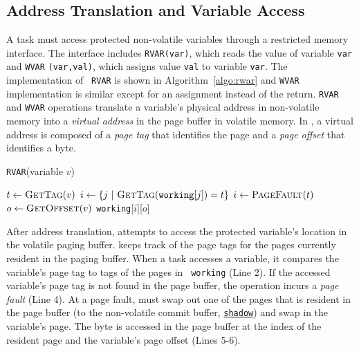 \subsection{Address Translation and Variable Access}

A \sys task must access protected non-volatile variables through a restricted memory
interface. The interface includes \texttt{RVAR(var)}, which reads the value of
variable {\tt var} and \texttt{WVAR} \texttt{(var,val)}, which assigns
value {\tt val} to variable {\tt var}. The implementation of {\tt
RVAR} is shown in Algorithm~\ref{algo:rwar} and {\tt WVAR} implementation is
similar except for an assignment instead of the return.
%
{\tt RVAR} and {\tt WVAR} operations translate a variable's physical address in non-volatile memory into a \emph{virtual address} in the page buffer in volatile memory.  In \sys, a virtual address is composed of a \emph{page tag} that identifies the page and a \emph{page offset} that identifies a byte.


\begin{algorithm}[t]
	\caption{\texttt{RVAR}(variable $v$)}
	\label{algo:rwar}
	\scriptsize
	\begin{algorithmic}[1]
		\State $t \leftarrow \Call{GetTag}{v}$ 
        \State $i \gets \{ j\ |\ \Call{GetTag}{\texttt{working}[j]} = t \}$ 
		 
		\State	$i \gets \Call{PageFault}{t}$ 
		\EndIf
		\State $o \leftarrow \Call{GetOffset}{v}$ 		
		\State \Return \texttt{working}[$i$][$o$]  
	\end{algorithmic}
\end{algorithm}

After address translation, \sys attempts to access the protected variable's
location in the volatile paging buffer. \sys keeps track of the page tags for
the pages currently resident in the paging buffer. When a task accesses a
variable, it compares the variable's page tag to tags of the pages in {\tt
working} (Line 2).
%
%
If the accessed variable's page tag is not found in the page buffer, the
operation incurs a {\em page fault} (Line 4). At a page fault, \sys must swap
out one of the pages that is resident in the page buffer (to the non-volatile
commit buffer, \texttt{\underline{shadow}}) and swap in the variable's page.
%
The byte is accessed in the page buffer at the index of the resident page and
the variable's page offset (Lines 5-6).

